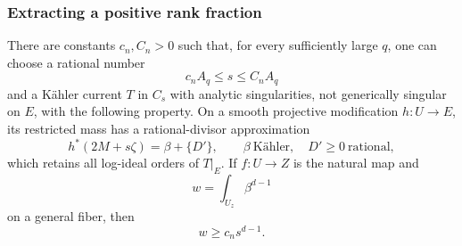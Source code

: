 \subsubsection{Extracting a positive rank fraction}

\begin{lemma}\label{zero:diagonal-mass}
There are constants \(c_n,C_n>0\) such that, for every sufficiently
large \(q\), one can choose a rational number
\[
 c_nA_q\le s\le C_nA_q
\]
and a Kähler current \(T\) in \(C_s\) with analytic singularities,
not generically singular on \(E\), with the following property.  On a
smooth projective modification \(h:U\to E\), its restricted mass has
a rational-divisor approximation
\begin{equation}\label{zero:selected-decomposition}
 h^*(2M+s\zeta)=\beta+\{D'\},
 \qquad \beta\ \text{Kähler},\quad D'\ge0\ \text{rational},
\end{equation}
which retains all log-ideal orders of \(T|_E\).  If
\(f:U\to Z\) is the natural map and
\[
 w=\int_{U_z}\beta^{d-1}
\]
on a general fiber, then
\begin{equation}\label{zero:selected-w}
 w\ge c_ns^{d-1}.
\end{equation}
\end{lemma}


